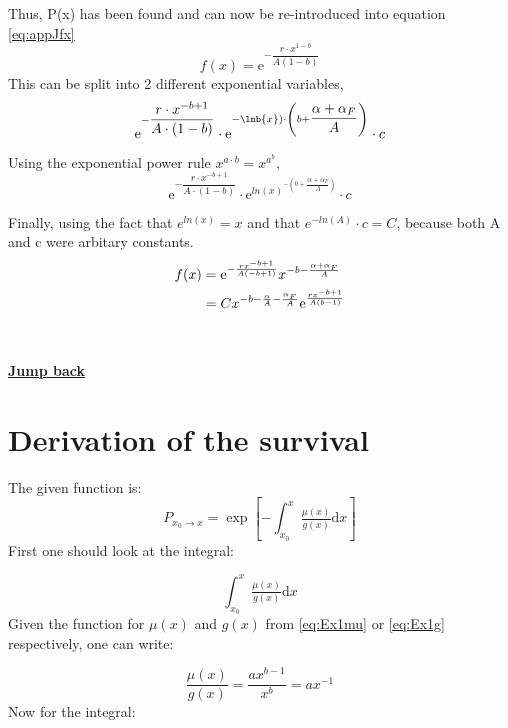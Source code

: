 \documentclass{article}
\numberwithin{equation}{section} %
\newcommand{\me}{\mathrm{e}}
\newcommand{\md}{\mathrm{d}}
\begin{document}
Thus, P(x) has been found and can now be re-introduced into equation \ref{eq:appJfx}
\begin{equation}
   f(x) = \mathrm{e}^{- \dfrac{r\cdot x^{1-b}}{A(1-b)}}
\end{equation}
This can be split into 2 different exponential variables,
\begin{equation}
    \mathrm{e}^{-\dfrac{r\cdot x^{-b+1}}{A\cdot (1-b)}}\cdot \mathrm{e}^{-\lnb{x})\cdot \left( b+\dfrac{\alpha+\alpha_{F}}{A} \right)}\cdot c
\end{equation}
Using the exponential power rule $x^{a\cdot b }= x^{a^{b}}$,
\begin{equation}
    \me^{-{\dfrac{r\cdot x^{-b+1}}{A\cdot (1-b)}}}\cdot \me^{ln(x)^{-\left( b+\dfrac{\alpha+\alpha_{F}}{A} \right)}}\cdot c 
\end{equation}

Finally, using the fact that $e^{ln(x)}=x$ and that $e^{-ln(A)}\cdot c = C$, because both A and c were arbitary constants.
\begin{equation}
\begin{aligned}
    f(x)&={{\rm e}^{-{\frac {r{x}^{-b+1}}{A \left( -b+1 \right) }}}}{x}^{-b-{\frac {\alpha+\alpha_{F}}{A}}}\\
    &=C{x}^{-b-{\frac {\alpha}{A}}-{\frac {\alpha_{F}}{A}}}{{\rm e}^{{\frac 
{r{x}^{-b+1}}{A \left( b-1 \right) }}}}
\end{aligned}
\end{equation}\\
\\
\textbf{\hyperref[jmp:a:derivation_fx]{Jump back }}


\newpage
\section{Derivation of the survival}\label{a:survivalDerivation}
The given function is:
\begin{equation}\label{eq:a:survival}
    P_{x_0\rightarrow x} = \exp\left[{-\int_{x_0}^{x}\tfrac{\mu(x)}{g(x)}\md x}\right]
\end{equation}
First one should look at the integral:

\begin{equation}
    {\int_{x_0}^{x}\tfrac{\mu(x)}{g(x)}\md x}
\end{equation}
Given the function for $\mu(x)$ and $g(x)$ from \ref{eq:Ex1mu} or \ref{eq:Ex1g} respectively, one can write:

\begin{equation}
    \dfrac{\mu(x)}{g(x)}=\dfrac{ax^{b-1}}{x^b}=ax^{-1}
\end{equation}
Now for the integral:
\end{document}
